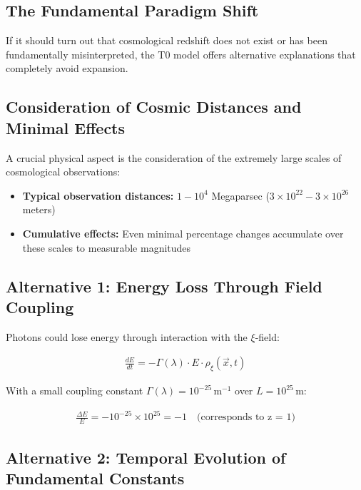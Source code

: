 \documentclass{article}
\begin{document}
\subsection{The Fundamental Paradigm Shift}

If it should turn out that cosmological redshift does not exist or has been fundamentally misinterpreted, the T0 model offers alternative explanations that completely avoid expansion.

\subsection{Consideration of Cosmic Distances and Minimal Effects}

A crucial physical aspect is the consideration of the extremely large scales of cosmological observations:

\begin{itemize}
	\item \textbf{Typical observation distances:} $1 - 10^4$ Megaparsec ($3 \times 10^{22} - 3 \times 10^{26}$ meters)
	\item \textbf{Cumulative effects:} Even minimal percentage changes accumulate over these scales to measurable magnitudes
\end{itemize}

\subsection{Alternative 1: Energy Loss Through Field Coupling}

Photons could lose energy through interaction with the $\xi$-field:

\begin{align}
	\frac{dE}{dt} = -\Gamma(\lambda) \cdot E \cdot \rho_\xi(\vec{x},t)
\end{align}

With a small coupling constant $\Gamma(\lambda) = 10^{-25} \, \text{m}^{-1}$ over $L = 10^{25} \, \text{m}$:

\begin{align}
	\frac{\Delta E}{E} = -10^{-25} \times 10^{25} = -1 \quad \text{(corresponds to z = 1)}
\end{align}

\subsection{Alternative 2: Temporal Evolution of Fundamental Constants}
\end{document}
